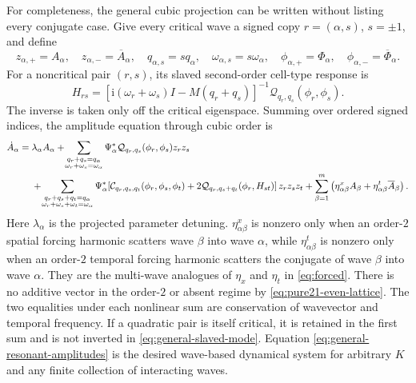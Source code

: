 \documentclass[11pt]{article}
\newcommand{\ii}{\mathrm{i}}
\newcommand{\cQ}{\mathcal Q}
\newcommand{\cC}{\mathcal C}
\begin{document}
For completeness, the general cubic projection can be written without
listing every conjugate case.  Give every critical wave a signed copy
$r=(\alpha,s)$, $s=\pm1$, and define
\begin{equation}
 z_{\alpha,+}=A_\alpha,\quad z_{\alpha,-}=\overline A_\alpha,
 \quad q_{\alpha,s}=s q_\alpha,\quad
 \omega_{\alpha,s}=s\omega_\alpha,\quad
 \phi_{\alpha,+}=\Phi_\alpha,\quad
 \phi_{\alpha,-}=\overline\Phi_\alpha.
\end{equation}
For a noncritical pair $(r,s)$, its slaved second-order cell-type response is
\begin{equation}
 H_{rs}=\left[\ii(\omega_r+\omega_s)I-M(q_r+q_s)\right]^{-1}
 \cQ_{q_r,q_s}(\phi_r,\phi_s).
 \label{eq:general-slaved-mode}
\end{equation}
The inverse is taken only off the critical eigenspace.  Summing over ordered
signed indices, the amplitude equation through cubic order is
\begin{align}
 \dot A_\alpha={}&\lambda_\alpha A_\alpha
 +\!\sum_{\substack{q_r+q_s=q_\alpha\\
                     \omega_r+\omega_s=\omega_\alpha}}
 \Psi_\alpha^*\cQ_{q_r,q_s}(\phi_r,\phi_s)z_rz_s\notag\\
 &+\!\sum_{\substack{q_r+q_s+q_t=q_\alpha\\
                     \omega_r+\omega_s+\omega_t=\omega_\alpha}}
 \Psi_\alpha^*\!\left[
 \cC_{q_r,q_s,q_t}(\phi_r,\phi_s,\phi_t)
 +2\cQ_{q_r,q_s+q_t}(\phi_r,H_{st})\right]z_rz_sz_t
 +\sum_{\beta=1}^m\left(
 \eta^x_{\alpha\beta}A_\beta
 +\eta^t_{\alpha\beta}\overline A_\beta\right).
 \label{eq:general-resonant-amplitudes}
\end{align}
Here $\lambda_\alpha$ is the projected parameter detuning.
$\eta^x_{\alpha\beta}$ is nonzero only when an order-$2$ spatial forcing
harmonic scatters wave $\beta$ into wave $\alpha$, while
$\eta^t_{\alpha\beta}$ is nonzero
only when an order-$2$ temporal forcing harmonic scatters the conjugate of
wave $\beta$ into wave $\alpha$.  They are the multi-wave analogues of
$\eta_x$ and $\eta_t$ in \eqref{eq:forced}.  There is no additive vector in
the order-$2$ or absent regime by \eqref{eq:pure21-even-lattice}.  The two
equalities under each nonlinear sum are conservation of wavevector and
temporal frequency.  If a quadratic pair is itself critical, it is retained
in the first sum and is not inverted in
\eqref{eq:general-slaved-mode}.  Equation
\eqref{eq:general-resonant-amplitudes} is the desired wave-based dynamical
system for arbitrary $K$ and any finite collection of interacting waves.
\end{document}
